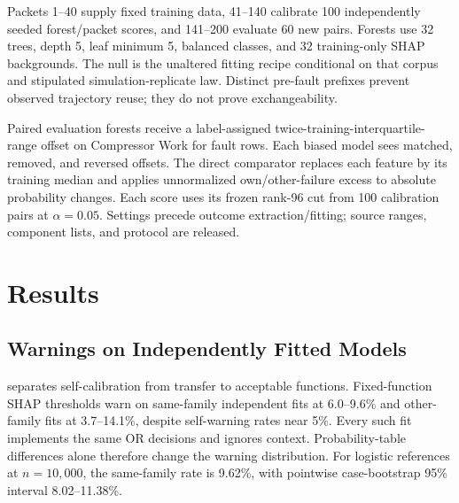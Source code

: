 \documentclass[conference]{IEEEtran}
\begin{document}
Packets 1--40 supply fixed training data, 41--140 calibrate 100 independently seeded forest/packet scores, and 141--200 evaluate 60 new pairs. Forests use 32 trees, depth 5, leaf minimum 5, balanced classes, and 32 training-only SHAP backgrounds. The null is the unaltered fitting recipe conditional on that corpus and stipulated simulation-replicate law. Distinct pre-fault prefixes prevent observed trajectory reuse; they do not prove exchangeability.

Paired evaluation forests receive a label-assigned twice-training-interquartile-range offset on Compressor Work for fault rows. Each biased model sees matched, removed, and reversed offsets. The direct comparator replaces each feature by its training median and applies unnormalized own/other-failure excess to absolute probability changes. Each score uses its frozen rank-96 cut from 100 calibration pairs at $\alpha=0.05$. Settings precede outcome extraction/fitting; source ranges, component lists, and protocol are released.

\section{Results}
\label{sec:results}
\subsection{Warnings on Independently Fitted Models}
 separates self-calibration from transfer to acceptable functions. Fixed-function SHAP thresholds warn on same-family independent fits at 6.0--9.6\% and other-family fits at 3.7--14.1\%, despite self-warning rates near 5\%. Every such fit implements the same OR decisions and ignores context. Probability-table differences alone therefore change the warning distribution. For logistic references at $n=10{,}000$, the same-family rate is 9.62\%, with pointwise case-bootstrap 95\% interval 8.02--11.38\%.

\begin{table}[t]
\centering
\caption{SHAP warning frequency (\%) with fixed overlap bins. Fixed-function columns use one $f$ for calibration. Independent controls are decision-equivalent mechanism-only fits; the cross-family column spans the two other families. Composite calibration uses one batch per independent same-family fit. Each evaluated stratum has 200 models and 200 test batches per model.}
\label{tab:transfer-warning}
\footnotesize

\end{table}
\end{document}
